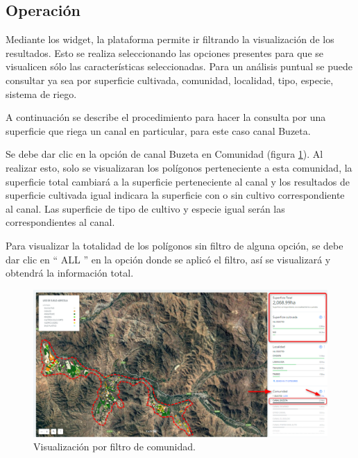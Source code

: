\documentclass[10pt]{article}
\begin{document}
\subsection{Operación}
\label{operasuel 2.2}

Mediante los widget, la plataforma permite ir filtrando la visualización de los resultados. Esto se realiza seleccionando las opciones presentes para que se visualicen sólo las características seleccionadas. Para un análisis puntual se puede consultar ya sea por superficie cultivada, comunidad, localidad, tipo, especie, sistema de riego.\bigskip\setlength{\parindent}{0pt}

A continuación se describe el procedimiento para hacer la consulta por una superficie que riega un canal en particular, para este caso canal Buzeta.\bigskip\setlength{\parindent}{0pt}



Se debe dar clic en la opción de canal Buzeta en Comunidad (figura \ref{6}). Al realizar esto, solo se visualizaran los polígonos perteneciente a esta comunidad, la superficie total cambiará a la superficie perteneciente al canal y los resultados de superficie cultivada igual indicara la superficie con o sin cultivo correspondiente al canal. Las superficie de tipo de cultivo y especie igual serán las correspondientes al canal.\bigskip\setlength{\parindent}{0pt}

Para visualizar la totalidad de los polígonos sin filtro de alguna opción, se debe dar clic en “ ALL ” en la opción donde se aplicó el filtro, así se visualizará y obtendrá la información total.\bigskip\setlength{\parindent}{0pt}

\begin{figure}[H]
\centering
\includegraphics[width=\textwidth]{Figuras_manual/visor_filtro.png}
\caption{Visualización por filtro de comunidad.}
\label{6}
\end{figure}
\end{document}
